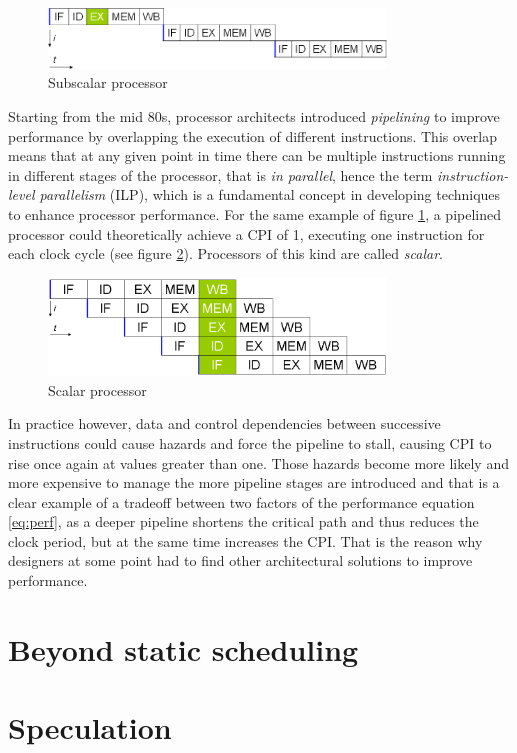 \begin{figure}[hbtp]
  \centering
  \includegraphics[width=0.8\textwidth]{img/subscalar.png}
  \caption{Subscalar processor}
  \label{fig:subscalar}
\end{figure}

Starting from the mid 80s, processor architects introduced \emph{pipelining} to improve performance by overlapping the execution of different instructions. This overlap means that at any given point in time there can be multiple instructions running in different stages of the processor, that is \emph{in parallel}, hence the term \emph{instruction-level parallelism} (ILP), which is a fundamental concept in developing techniques to enhance processor performance. For the same example of figure \ref{fig:subscalar}, a pipelined processor could theoretically achieve a CPI of 1, executing one instruction for each clock cycle (see figure \ref{fig:scalar}). Processors of this kind are called \emph{scalar}.

\begin{figure}[hbtp]
  \centering
  \includegraphics[width=0.8\textwidth]{img/scalar.png}
  \caption{Scalar processor}
  \label{fig:scalar}
\end{figure}

In practice however, data and control dependencies between successive instructions could cause hazards and force the pipeline to stall, causing CPI to rise once again at values greater than one. Those hazards become more likely and more expensive to manage the more pipeline stages are introduced and that is a clear example of a tradeoff between two factors of the performance equation \eqref{eq:perf}, as a deeper pipeline shortens the critical path and thus reduces the clock period, but at the same time increases the CPI. That is the reason why designers at some point had to find other architectural solutions to improve performance.


\section{Beyond static scheduling}

\section{Speculation}

